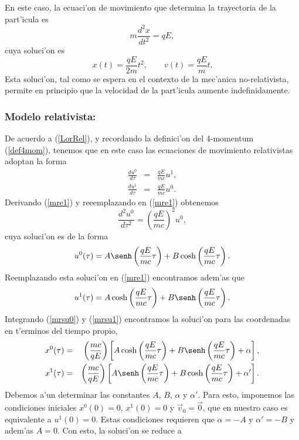 En este caso, la ecuaci'on de movimiento que determina la trayectoria de la
part'icula es
\begin{equation}
m\frac{d^2x}{dt^2}=qE,
\end{equation}
cuya soluci'on es
\begin{equation}
x(t)=\frac{qE}{2m}t^2, \qquad v(t)=\frac{qE}{m}t.
\end{equation}
Esta soluci'on, tal como se espera en el contexto de la mec'anica
no-relativista, permite en principio que la velocidad de la part'icula aumente
indefinidamente.

\subsubsection{Modelo relativista:}

De acuerdo a (\ref{LorRel}), y recordando la definici'on del 4-momentum (\ref{def4mom}), tenemos que en este caso las ecuaciones de movimiento relativistas adoptan la forma
\begin{eqnarray}
\frac{du^0}{d\tau}&=& \frac{qE}{mc} u^1, \label{mre1} \\
\frac{du^1}{d\tau}&=&\frac{qE}{mc} u^0.\label{mre2}
\end{eqnarray}
Derivando (\ref{mre1}) y reeemplazando en (\ref{mre1}) obtenemos
\begin{equation}
 \frac{d^2u^0}{d\tau^2}=\left( \frac{qE}{mc}\right)^2 u^0,
\end{equation}
cuya soluci'on es de la forma
\begin{equation}
u^0(\tau)=A\senh\left( \frac{qE}{mc}\tau\right)+B\cosh\left(
\frac{qE}{mc}\tau\right). \label{mrsu0}
\end{equation}
Reemplazando esta soluci'on en (\ref{mre1}) encontramos adem'as que
\begin{equation}
u^1(\tau)=A\cosh\left( \frac{qE}{mc}\tau\right)+B\senh\left(
\frac{qE}{mc}\tau\right). \label{mrsu1}
\end{equation}
Integrando (\ref{mrsu0}) y (\ref{mrsu1}) encontramos la soluci'on para las coordenadas en t'erminos del tiempo propio,
\begin{eqnarray}
x^0(\tau)&=&\left(\frac{mc}{qE}\right)\left[A\cosh\left( \frac{qE}{mc}\tau\right)+B\senh\left(
\frac{qE}{mc}\tau\right)+\alpha\right] ,\\
x^1(\tau)&=&\left(\frac{mc}{qE}\right)\left[A\senh\left( \frac{qE}{mc}\tau\right)+B\cosh\left(
\frac{qE}{mc}\tau\right)+\alpha'\right] .
\end{eqnarray}
Debemos a'un determinar las constantes $A$, $B$, $\alpha$ y $\alpha'$. Para esto, imponemos las condiciones iniciales $x^0(0)=0$, $x^1(0)=0$ y $\vec{v}_0=\vec{0}$, que en nuestro caso es equivalente a $u^1(0)=0$. Estas condiciones requieren que $\alpha=-A$ y $\alpha'=-B$ y adem'as $A=0$. Con esto, la soluci'on se reduce a
